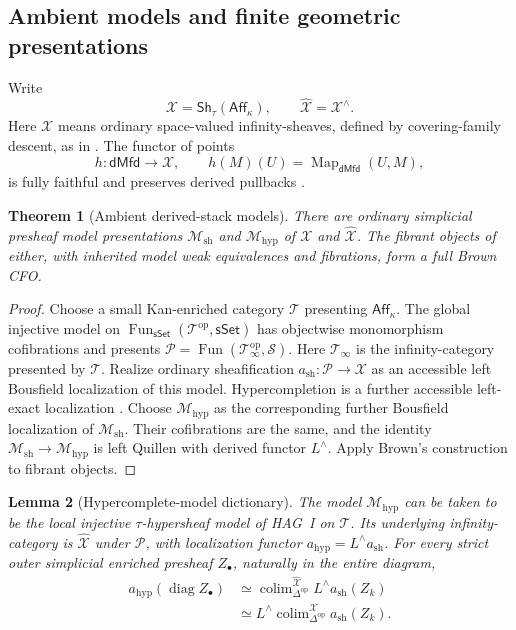 \documentclass[12pt]{amsart}
\newtheorem{thm}{Theorem}[section]
\newtheorem{lem}[thm]{Lemma}
\theoremstyle{definition}
\theoremstyle{remark}
\numberwithin{equation}{section}
\newcommand{\CM}{\mathcal M}
\newcommand{\CT}{\mathcal T}
\newcommand{\Aff}{\mathsf{Aff}}
\newcommand{\dMfd}{\mathsf{dMfd}}
\newcommand{\Sh}{\mathsf{Sh}}
\newcommand{\sSet}{\mathsf{sSet}}
\newcommand{\op}{\mathrm{op}}
\DeclareMathOperator{\Map}{Map}
\DeclareMathOperator{\Fun}{Fun}
\begin{document}
\subsection{Ambient models and finite geometric presentations}

Write
\[
 \mathcal X=\Sh_\tau(\Aff_\kappa),
 \qquad \widehat{\mathcal X}=\mathcal X^\wedge.
\]
Here $\mathcal X$ means ordinary space-valued infinity-sheaves,
defined by covering-family descent, as in
\cite[Definition~5.1.1 and Section~5.2.1]{NuitenThesis2018}.
The functor of points
\[
 h:\dMfd\longrightarrow\mathcal X,\qquad
 h(M)(U)=\Map_{\dMfd}(U,M),
\]
is fully faithful and preserves derived pullbacks
\cite[Proposition~5.2.3, proof on p.~135]{NuitenThesis2018}.

\begin{thm}[Ambient derived-stack models]\label{thm:derived-ambient}
There are ordinary simplicial presheaf model presentations
$\CM_{\mathrm{sh}}$ and $\CM_{\mathrm{hyp}}$ of
$\mathcal X$ and $\widehat{\mathcal X}$. The fibrant objects of
either, with inherited model weak equivalences and fibrations,
form a full Brown CFO.
\end{thm}

\begin{proof}
Choose a small Kan-enriched category $\CT$ presenting $\Aff_\kappa$.
The global injective model on
$\Fun_{\sSet}(\CT^\op,\sSet)$ has objectwise monomorphism
cofibrations \cite[Proposition~3.6.1]{HAGI2005}
and presents
$\mathcal P=\Fun(\CT_\infty^\op,\mathcal S)$.
Here $\CT_\infty$ is the infinity-category presented by $\CT$.
Realize ordinary sheafification
$a_{\mathrm{sh}}:\mathcal P\to\mathcal X$
as an accessible left Bousfield localization of this model.
Hypercompletion is a further accessible left-exact localization
\cite[pp.~668--669]{LurieHTT2009}.
Choose $\CM_{\mathrm{hyp}}$ as the corresponding further
Bousfield localization of $\CM_{\mathrm{sh}}$. Their cofibrations
are the same, and the identity
$\CM_{\mathrm{sh}}\to\CM_{\mathrm{hyp}}$ is left Quillen
with derived functor $L^\wedge$.
Apply Brown's construction to fibrant objects.
\end{proof}

\begin{lem}[Hypercomplete-model dictionary]
\label{lem:derived-model-dictionary}
The model $\CM_{\mathrm{hyp}}$ can be taken to be the local
injective $\tau$-hypersheaf model of HAG~I on $\CT$.
Its underlying infinity-category is $\widehat{\mathcal X}$
\emph{under} $\mathcal P$, with localization functor
$a_{\mathrm{hyp}}=L^\wedge a_{\mathrm{sh}}$.
For every strict outer simplicial enriched presheaf $Z_\bullet$,
naturally in the entire diagram,
\begin{equation}\label{eq:derived-diagonal-realization}
\begin{split}
 a_{\mathrm{hyp}}(\operatorname{diag}Z_\bullet)
 &\simeq
 \mathop{\operatorname{colim}}\nolimits_{\Delta^\op}^{\widehat{\mathcal X}}
 L^\wedge a_{\mathrm{sh}}(Z_k)\\
 &\simeq
 L^\wedge
 \mathop{\operatorname{colim}}\nolimits_{\Delta^\op}^{\mathcal X}
 a_{\mathrm{sh}}(Z_k).
\end{split}
\end{equation}
\end{lem}
\end{document}
